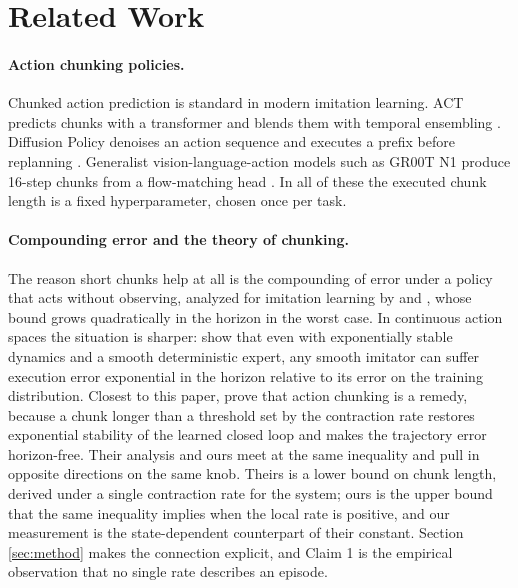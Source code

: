 \section{Related Work}

\paragraph{Action chunking policies.}
Chunked action prediction is standard in modern imitation learning. ACT
predicts chunks with a transformer and blends them with temporal ensembling
\citep{zhao2023act}. Diffusion Policy denoises an action sequence and executes
a prefix before replanning \citep{chi2023diffusion}. Generalist
vision-language-action models such as GR00T N1 produce 16-step chunks from a
flow-matching head \citep{gr00t2025}. In all of these the executed chunk
length is a fixed hyperparameter, chosen once per task.

\paragraph{Compounding error and the theory of chunking.}
The reason short chunks help at all is the compounding of error under a policy
that acts without observing, analyzed for imitation learning by
\citet{ross2010efficient} and \citet{ross2011dagger}, whose bound grows
quadratically in the horizon in the worst case. In continuous action spaces the
situation is sharper: \citet{simchowitz2025pitfalls} show that even with
exponentially stable dynamics and a smooth deterministic expert, any smooth
imitator can suffer execution error exponential in the horizon relative to its
error on the training distribution. Closest to this paper,
\citet{zhang2025chunking} prove that action chunking is a remedy, because a
chunk longer than a threshold set by the contraction rate restores exponential
stability of the learned closed loop and makes the trajectory error
horizon-free. Their analysis and ours meet at the same inequality and pull in
opposite directions on the same knob. Theirs is a lower bound on chunk length,
derived under a single contraction rate for the system; ours is the upper bound
that the same inequality implies when the local rate is positive, and our
measurement is the state-dependent counterpart of their constant. Section
\ref{sec:method} makes the connection explicit, and Claim 1 is the empirical
observation that no single rate describes an episode.

